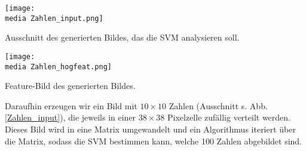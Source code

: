 \begin{dsafigure}
\begin{center}
	\texttt{[image: \\media Zahlen\_input.png]}
	\caption{Ausschnitt des generierten Bildes, das die SVM analysieren soll.}
	\label{Zahlen_input}
\end{center}
\end{dsafigure}

\begin{dsafigure}
\begin{center}
	\texttt{[image: \\media Zahlen\_hogfeat.png]}
	\caption{Feature-Bild des generierten Bildes.}
	\label{Zahlen_hogfeat}
\end{center}
\end{dsafigure}

Daraufhin erzeugen wir ein Bild mit $10 \times 10$ Zahlen (Ausschnitt s. Abb. \ref{Zahlen_input}), die jeweils in einer $38 \times 38$ Pixelzelle zufällig verteilt werden. Dieses Bild wird in eine Matrix umgewandelt und ein Algorithmus iteriert über die Matrix, sodass die SVM bestimmen kann, welche 100 Zahlen abgebildet sind.